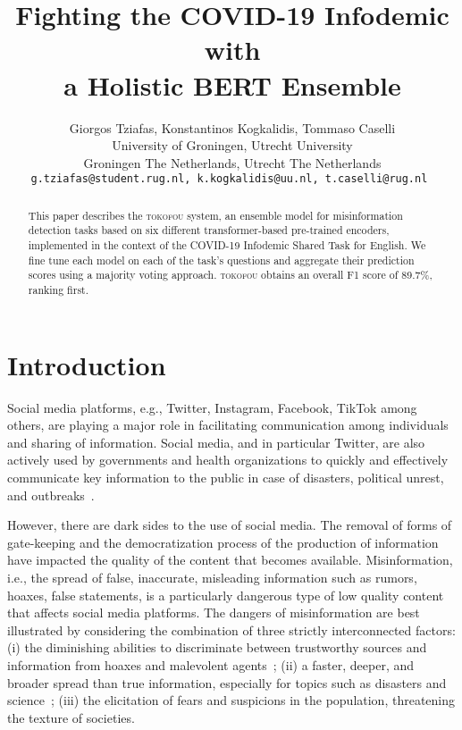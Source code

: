 \documentclass[11pt,a4paper]{article}
\title{Fighting the COVID-19 Infodemic with\\ a Holistic BERT Ensemble}
\author{Giorgos Tziafas, Konstantinos Kogkalidis, 
 Tommaso Caselli  \\
University of Groningen, Utrecht University\\
         Groningen The Netherlands, Utrecht The Netherlands\\
\tt g.tziafas@student.rug.nl,
 k.kogkalidis@uu.nl,
 t.caselli@rug.nl
}
\begin{document}
\maketitle

\begin{abstract}
This paper describes the \textsc{tokofou} system, an ensemble model for misinformation detection tasks based on six different transformer-based pre-trained encoders, implemented in the context of the COVID-19 Infodemic Shared Task for English. We fine tune each model on each of the task's questions and aggregate their prediction scores using a majority voting approach. \textsc{tokofou} obtains an overall F1 score of 89.7\%, ranking first. 

\end{abstract}

\section{Introduction}
Social media platforms, e.g., Twitter, Instagram, Facebook, TikTok among others, are playing a major role in facilitating communication among individuals and sharing of information. Social media, and in particular Twitter, are also actively used by governments and health organizations to quickly and effectively communicate key information to the public in case of disasters, political unrest, and outbreaks~\cite{househ2016communicating,stefanidis2017zika,lalone2017embracing,daughton2019identifying,rogers-etal-2019-calls}.

However, there are dark sides to the use of social media. The removal of forms of gate-keeping and the democratization process of the production of information have impacted the quality of the content that becomes available. Misinformation, i.e., the spread of false, inaccurate, misleading information such as rumors, hoaxes, false statements, is a particularly dangerous type of low quality content that affects social media platforms. The dangers of misinformation are best illustrated by considering the combination of three strictly interconnected factors: (i) the diminishing abilities to discriminate between trustworthy sources and information from hoaxes and malevolent agents~\cite{hargittai2010trust}; (ii) a faster, deeper, and broader spread than true information, especially for topics such as disasters and science~\cite{vosoughi2018spread}; (iii) the elicitation of fears and suspicions in the population, threatening the texture of societies. 
\end{document}
